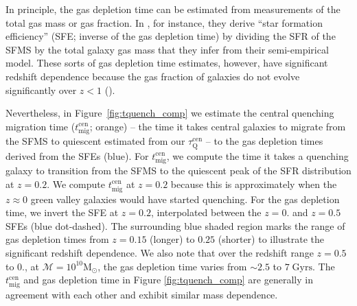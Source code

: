 \documentclass[iop,apj,tighten,twocolappendix,numberedappendix]{emulateapj}
\newcommand{\taucen}{\tau_\mathrm{Q}^\mathrm{cen}}
\begin{document}
In principle, the gas depletion time can be estimated from 
measurements of the total gas mass or gas fraction. 
In \cite{Popping:2015aa}, for instance, they derive 
``star formation efficiency'' (SFE; inverse of the gas depletion time) 
by dividing the SFR of the SFMS by the total galaxy gas mass that 
they infer from their semi-empirical model. These sorts of gas 
depletion time estimates, however, have significant redshift 
dependence because the gas fraction of galaxies do not evolve 
significantly over $z < 1$ 
(\citealt{Stewart:2009aa, Santini:2014aa, Popping:2015aa}).

Nevertheless, in Figure~\ref{fig:tquench_comp} we estimate the  central quenching 
migration time ($t_\mathrm{mig}^\mathrm{cen}$; orange) -- the time it takes
central galaxies to migrate from the SFMS to quiescent estimated from 
our $\taucen$ -- to the gas depletion times derived from 
the \cite{Popping:2015aa} SFEs (blue). For $t_\mathrm{mig}^\mathrm{cen}$, 
we compute the time it takes a quenching galaxy to transition from 
the SFMS to the quiescent peak of the SFR distribution at $z = 0.2$. 
We compute $t_\mathrm{mig}^\mathrm{cen}$ at $z = 0.2$ because this 
is approximately when the $z \approx 0$ green valley galaxies would 
have started quenching. For the gas depletion time, we invert the 
SFE at $z = 0.2$, interpolated between the $z = 0.$ and $z=0.5$ 
\cite{Popping:2015aa} SFEs (blue dot-dashed). The surrounding 
blue shaded region marks the range of gas depletion times from 
$z = 0.15$ (longer) to $0.25$ (shorter) to illustrate the significant 
redshift dependence. We also note that over the redshift range 
$z = 0.5$ to $0.$, at $\mathcal{M} = 10^{10}\mathrm{M}_\odot$, 
the \cite{Popping:2015aa} gas depletion time varies from $\sim 2.5$ 
to $7 \;\mathrm{Gyrs}$. The $t_\mathrm{mig}^\mathrm{cen}$ and
gas depletion time in Figure \ref{fig:tquench_comp} are generally 
in agreement with each other and exhibit similar mass dependence.
\end{document}
